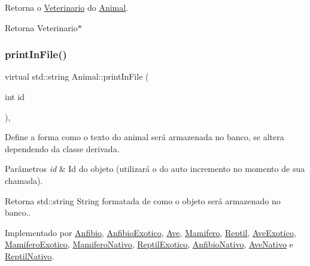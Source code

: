 Retorna o \hyperlink{classVeterinario}{Veterinario} do \hyperlink{classAnimal}{Animal}. 

\begin{DoxyReturn}{Retorna}
Veterinario$\ast$ 
\end{DoxyReturn}
\mbox{\label{classAnimal_ac75406040726a6339932d70164cc7242}} 
\subsubsection{\texorpdfstring{print\+In\+File()}{printInFile()}}
{\footnotesize\ttfamily virtual std\+::string Animal\+::print\+In\+File (\begin{DoxyParamCaption}\item[{int}]{id }\end{DoxyParamCaption})\hspace{0.3cm}{\ttfamily [protected]}, {}}



Define a forma como o texto do animal será armazenada no banco, se altera dependendo da classe derivada. 


\begin{DoxyParams}{Parâmetros}
{\em id} & Id do objeto (utilizará o do auto incremento no momento de sua chamada). \\
\hline
\end{DoxyParams}
\begin{DoxyReturn}{Retorna}
std\+::string String formatada de como o objeto será armazenado no banco.. 
\end{DoxyReturn}


Implementado por \hyperlink{classAnfibio_ab866ca21fb00c2d4d571aadd271eadec}{Anfibio}, \hyperlink{classAnfibioExotico_a08d9debec54258a0f43c8c503dfb23d0}{Anfibio\+Exotico}, \hyperlink{classAve_ab858405e18c56876e331ad943885ee53}{Ave}, \hyperlink{classMamifero_ae91b67a8f0f508793a801aadcaa18570}{Mamifero}, \hyperlink{classReptil_a53fd59f3aed9c2d463722a8e97401406}{Reptil}, \hyperlink{classAveExotico_a4ba81def12131f047b3800e5f10a983b}{Ave\+Exotico}, \hyperlink{classMamiferoExotico_a4ee6f5f4a2917cfdf54304525add0c4a}{Mamifero\+Exotico}, \hyperlink{classMamiferoNativo_ae2f2b00cb6720cea2780ebef78be52ea}{Mamifero\+Nativo}, \hyperlink{classReptilExotico_a71312f425b92e04d8f29a856abd83f26}{Reptil\+Exotico}, \hyperlink{classAnfibioNativo_a7926e1af44542ee268e27dd3d862f583}{Anfibio\+Nativo}, \hyperlink{classAveNativo_ab95679ed20354b2183706db24899d316}{Ave\+Nativo} e \hyperlink{classReptilNativo_ac801a11c87a2847fb4b46488aa6bb789}{Reptil\+Nativo}.

